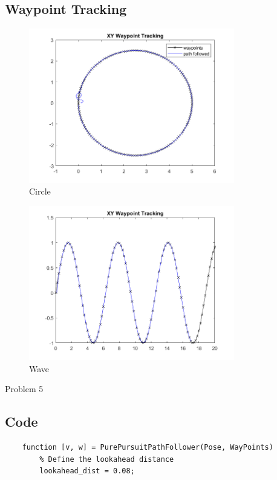 \documentclass[answers]{exam}
\begin{document}
\begin{questions}
    \subsection*{Waypoint Tracking}
    \begin{figure}[H]
        \centering
        \includegraphics[width=0.8\textwidth]{images/4-circle.png}
        \caption{Circle}
        \label{fig:my_label}
    \end{figure}

    \begin{figure}[H]
        \centering
        \includegraphics[width=0.8\textwidth]{images/4-wave.png}
        \caption{Wave}
        \label{fig:my_label}
    \end{figure}

    \question Problem 5
    \subsection*{Code}
    \begin{lstlisting}
    function [v, w] = PurePursuitPathFollower(Pose, WayPoints)
        % Define the lookahead distance
        lookahead_dist = 0.08;
    

\end{lstlisting}
\end{questions}
\end{document}
